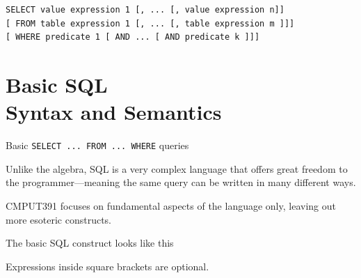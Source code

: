 \documentclass[xcolor={usenames,dvipsnames}]{beamer}
\begin{document}
%
%
%
%

\newsavebox\BasicSQLQuery
\begin{lrbox}{\BasicSQLQuery}
\begin{minipage}{0.9\textwidth}
%
%
  \begin{lstlisting}[style=SQL]
  SELECT value expression 1 [, ... [, value expression n]]
[ FROM table expression 1 [, ... [, table expression m ]]]
[ WHERE predicate 1 [ AND ... [ AND predicate k ]]]
\end{lstlisting}
\end{minipage}
\end{lrbox}

%
%


%
%

\section{Basic SQL\\{\small Syntax and Semantics}}

\begin{frame}[fragile]{Basic \lstinline[style=SQL]{SELECT ... FROM ... WHERE} queries}

Unlike the algebra, SQL is a very complex language that offers great freedom to the programmer---meaning the same query can be written in many different ways.\\
 
\begin{block}{}
CMPUT391 focuses on fundamental aspects of the language only, leaving out more esoteric constructs.
\end{block}

The basic SQL construct looks like this

\begin{center}
\fbox{\usebox\BasicSQLQuery}
\end{center}

Expressions inside square brackets are optional.
\end{frame}

%
%
\end{document}
